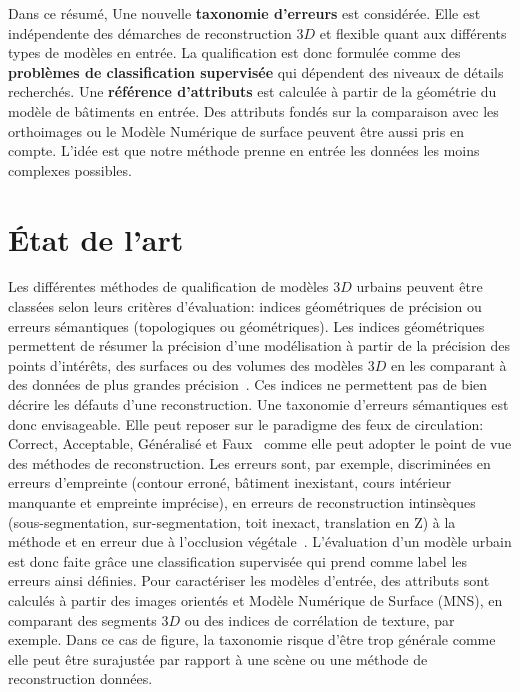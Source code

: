 \documentclass[a4paper,french]{article}
\begin{document}
    Dans ce résumé, Une nouvelle \textbf{taxonomie d'erreurs} est considérée. Elle est indépendente des démarches de reconstruction $3D$ et flexible quant aux différents types de modèles en entrée. La qualification est donc formulée comme des \textbf{problèmes de classification supervisée} qui dépendent des niveaux de détails recherchés. Une \textbf{référence d'attributs} est calculée à partir de la géométrie du modèle de bâtiments en entrée. Des attributs fondés sur la comparaison avec les orthoimages ou le Modèle Numérique de surface peuvent être aussi pris en compte. L'idée est que notre méthode prenne en entrée les données les moins complexes possibles.

    \section{\'Etat de l'art}

    Les différentes méthodes de qualification de modèles $3D$ urbains peuvent être classées selon leurs critères d'évaluation: indices géométriques de précision ou erreurs sémantiques (topologiques ou géométriques). Les indices géométriques permettent de résumer la précision d'une modélisation à partir de la précision des points d'intérêts, des surfaces ou des volumes des modèles $3D$ en les comparant à des données de plus grandes précision~\cite{Zeng2014}. Ces indices ne permettent pas de bien décrire les défauts d'une reconstruction. Une taxonomie d'erreurs sémantiques est donc envisageable. Elle peut reposer sur le paradigme des feux de circulation: Correct, Acceptable, Généralisé et Faux~\cite{Boudet2006} comme elle peut adopter le point de vue des méthodes de reconstruction. Les erreurs sont, par exemple, discriminées en erreurs d'empreinte (contour erroné, bâtiment inexistant, cours intérieur manquante et empreinte imprécise), en erreurs de reconstruction intinsèques (sous-segmentation, sur-segmentation, toit inexact, translation en Z) à la méthode et en erreur due à l'occlusion végétale~\cite{Michelin2013}. L'évaluation d'un modèle urbain est donc faite grâce une classification supervisée qui prend comme label les erreurs ainsi définies. Pour caractériser les modèles d'entrée, des attributs sont calculés à partir des images orientés et Modèle Numérique de Surface (MNS), en comparant des segments $3D$ ou des indices de corrélation de texture, par exemple. Dans ce cas de figure, la taxonomie risque d'être trop générale comme elle peut être surajustée par rapport à une scène ou une méthode de reconstruction données.
\end{document}
